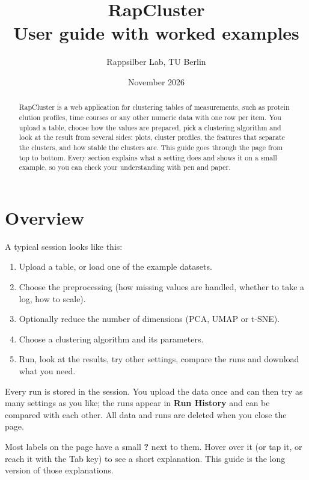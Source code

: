 \documentclass[11pt,a4paper]{article}
\title{\textbf{RapCluster}\\[4pt]\large User guide with worked examples}
\author{Rappsilber Lab, TU Berlin}
\date{November 2026}
\newcommand{\ui}[1]{\textsf{\textbf{#1}}}   %
\begin{document}
\maketitle

\begin{abstract}
\noindent RapCluster is a web application for clustering tables of measurements, such as protein elution profiles,
time courses or any other numeric data with one row per item. You upload a table, choose how the values are
prepared, pick a clustering algorithm and look at the result from several sides: plots, cluster profiles, the
features that separate the clusters, and how stable the clusters are. This guide goes through the page from top to
bottom. Every section explains what a setting does and shows it on a small example, so you can check your
understanding with pen and paper.
\end{abstract}

\tableofcontents
\newpage

\section{Overview}

A typical session looks like this:

\begin{enumerate}
  \item Upload a table, or load one of the example datasets.
  \item Choose the preprocessing (how missing values are handled, whether to take a log, how to scale).
  \item Optionally reduce the number of dimensions (PCA, UMAP or t-SNE).
  \item Choose a clustering algorithm and its parameters.
  \item Run, look at the results, try other settings, compare the runs and download what you need.
\end{enumerate}

Every run is stored in the session. You upload the data once and can then try as many settings as you like; the
runs appear in \ui{Run History} and can be compared with each other. All data and runs are deleted when you close
the page.

Most labels on the page have a small \ui{?} next to them. Hover over it (or tap it, or reach it with the Tab key)
to see a short explanation. This guide is the long version of those explanations.
\end{document}
